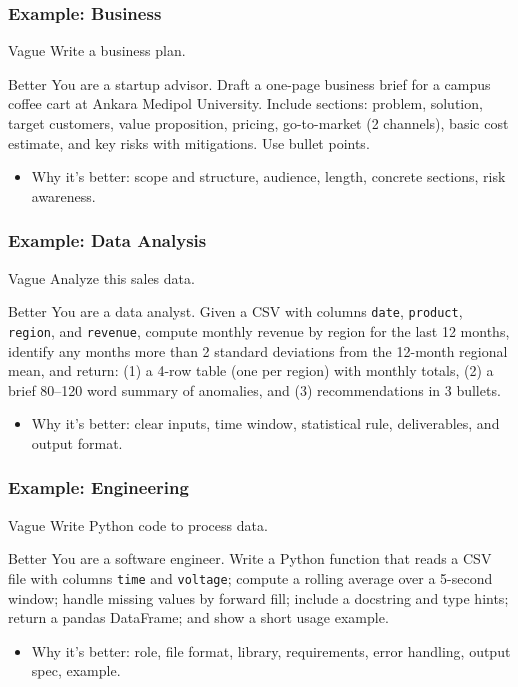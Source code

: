 \documentclass[11pt]{beamer}
\begin{document}
\begin{frame}
  \frametitle{Example: Business}
  \begin{block}{Vague}
  Write a business plan.
  \end{block}
  \begin{block}{Better}
  You are a startup advisor. Draft a one-page business brief for a campus coffee cart at Ankara Medipol University. Include sections: problem, solution, target customers, value proposition, pricing, go-to-market (2 channels), basic cost estimate, and key risks with mitigations. Use bullet points.
  \end{block}
  \begin{itemize}
    \item Why it's better: scope and structure, audience, length, concrete sections, risk awareness.
  \end{itemize}
\end{frame}

\begin{frame}
  \frametitle{Example: Data Analysis}
  \begin{block}{Vague}
  Analyze this sales data.
  \end{block}
  \begin{block}{Better}
  You are a data analyst. Given a CSV with columns \texttt{date}, \texttt{product}, \texttt{region}, and \texttt{revenue}, compute monthly revenue by region for the last 12 months, identify any months more than 2 standard deviations from the 12-month regional mean, and return: (1) a 4-row table (one per region) with monthly totals, (2) a brief 80--120 word summary of anomalies, and (3) recommendations in 3 bullets.
  \end{block}
  \begin{itemize}
    \item Why it's better: clear inputs, time window, statistical rule, deliverables, and output format.
  \end{itemize}
\end{frame}

\begin{frame}
  \frametitle{Example: Engineering}
  \begin{block}{Vague}
  Write Python code to process data.
  \end{block}
  \begin{block}{Better}
  You are a software engineer. Write a Python function that reads a CSV file with columns \texttt{time} and \texttt{voltage}; compute a rolling average over a 5-second window; handle missing values by forward fill; include a docstring and type hints; return a pandas DataFrame; and show a short usage example.
  \end{block}
  \begin{itemize}
    \item Why it's better: role, file format, library, requirements, error handling, output spec, example.
  \end{itemize}
\end{frame}
\end{document}
